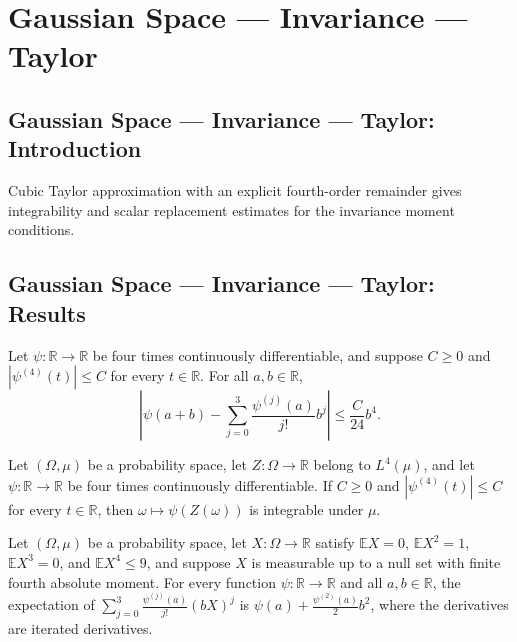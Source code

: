 \section{Gaussian Space --- Invariance --- Taylor}
\subsection*{Gaussian Space --- Invariance --- Taylor: Introduction}
Cubic Taylor approximation with an explicit fourth-order remainder gives integrability and scalar replacement estimates for the invariance moment conditions.

\subsection*{Gaussian Space --- Invariance --- Taylor: Results}

\begin{theorem}
\leanok
{}
Let $\psi\colon\mathbb R\to\mathbb R$ be four times continuously differentiable, and
suppose $C\ge0$ and $|\psi^{(4)}(t)|\le C$ for every $t\in\mathbb R$. For all
$a,b\in\mathbb R$,
\[\left|\psi(a+b)-\sum_{j=0}^{3}\frac{\psi^{(j)}(a)}{j!}b^j\right|\le\frac{C}{24}b^4.\]
\end{theorem}

\begin{theorem}
\leanok
{}
Let $(\Omega,\mu)$ be a probability space, let $Z:\Omega\to\mathbb R$ belong to
$L^4(\mu)$, and let $\psi:\mathbb R\to\mathbb R$ be four times continuously
differentiable. If $C\ge 0$ and $|\psi^{(4)}(t)|\le C$ for every $t\in\mathbb R$, then
$\omega\mapsto\psi(Z(\omega))$ is integrable under $\mu$.
\end{theorem}

\begin{theorem}
\leanok
{}
Let $(\Omega,\mu)$ be a probability space, let $X:\Omega\to\mathbb R$ satisfy $\mathbb E
X=0$, $\mathbb E X^2=1$, $\mathbb E X^3=0$, and $\mathbb E X^4\le 9$, and suppose $X$ is
measurable up to a null set with finite fourth absolute moment. For every function
$\psi:\mathbb R\to\mathbb R$ and all $a,b\in\mathbb R$, the expectation of
$\sum_{j=0}^{3}\frac{\psi^{(j)}(a)}{j!}(bX)^j$ is $\psi(a)+\frac{\psi^{(2)}(a)}{2}b^2$,
where the derivatives are iterated derivatives.
\end{theorem}

